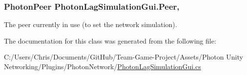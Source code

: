 \subsubsection[{\texorpdfstring{Peer}{Peer}}]{\setlength{\rightskip}{0pt plus 5cm}Photon\+Peer Photon\+Lag\+Simulation\+Gui.\+Peer\hspace{0.3cm}{\ttfamily [get]}, {\ttfamily [set]}}\hypertarget{class_photon_lag_simulation_gui_ad6ae62fc67cdb2936b13029ec7c68d64}{}\label{class_photon_lag_simulation_gui_ad6ae62fc67cdb2936b13029ec7c68d64}


The peer currently in use (to set the network simulation).



The documentation for this class was generated from the following file\+:\begin{DoxyCompactItemize}
\item 
C\+:/\+Users/\+Chris/\+Documents/\+Git\+Hub/\+Team-\/\+Game-\/\+Project/\+Assets/\+Photon Unity Networking/\+Plugins/\+Photon\+Network/\hyperlink{_photon_lag_simulation_gui_8cs}{Photon\+Lag\+Simulation\+Gui.\+cs}\end{DoxyCompactItemize}

